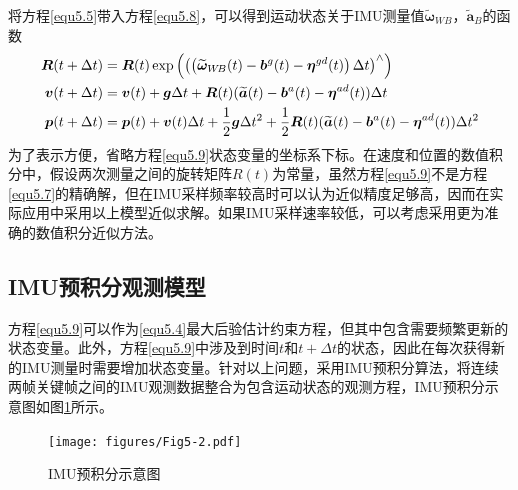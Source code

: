 将方程\eqref{equ5.5}带入方程\eqref{equ5.8}，可以得到运动状态关于IMU测量值$\widetilde{\boldsymbol{\omega}}_{W\!B}$，$\widetilde{\boldsymbol{a}}_B$的函数
\begin{equation}
\label{equ5.9}
\begin{aligned}
\boldsymbol{R}(t+\Delta t) &= \boldsymbol{R}(t)\exp \left( \left(  \left( \widetilde{\boldsymbol{\omega}}_{W\!B}(t)-\boldsymbol{b}^g(t)-\boldsymbol{\eta}^{gd}(t) \right) \Delta t \right)^{\wedge}  \right) \\ 
\boldsymbol{v}(t+\Delta t) &= \boldsymbol{v}(t)+\boldsymbol{g} \Delta t + \boldsymbol{R}(t)(\widetilde{\boldsymbol{a}}(t)-\boldsymbol{b}^a(t)-\boldsymbol{\eta}^{ad}(t))\Delta t \\
\boldsymbol{p}(t+\Delta t) &= \boldsymbol{p}(t)+\boldsymbol{v}(t)\Delta t + {1 \over 2}\boldsymbol{g}\Delta t^2 + {1 \over 2}\boldsymbol{R}(t)(\widetilde{\boldsymbol{a}}(t)-\boldsymbol{b}^a(t)-\boldsymbol{\eta}^{ad}(t))\Delta t^2
\end{aligned}
\end{equation}
为了表示方便，省略方程\eqref{equ5.9}状态变量的坐标系下标。在速度和位置的数值积分中，假设两次测量之间的旋转矩阵$R(t)$为常量，虽然方程\eqref{equ5.9}不是方程\eqref{equ5.7}的精确解，但在IMU采样频率较高时可以认为近似精度足够高，因而在实际应用中采用以上模型近似求解。如果IMU采样速率较低，可以考虑采用更为准确的数值积分近似方法。

\subsection{IMU预积分观测模型}
方程\eqref{equ5.9}可以作为\eqref{equ5.4}最大后验估计约束方程，但其中包含需要频繁更新的状态变量。此外，方程\eqref{equ5.9}中涉及到时间$t$和$t+\Delta t$的状态，因此在每次获得新的IMU测量时需要增加状态变量。针对以上问题，采用IMU预积分算法，将连续两帧关键帧之间的IMU观测数据整合为包含运动状态的观测方程，IMU预积分示意图如图\ref{fig5.2}所示。

\begin{figure}[h]
\centering
\texttt{[image: figures/Fig5-2.pdf]}
\caption{IMU预积分示意图}
\label{fig5.2}
\end{figure}

